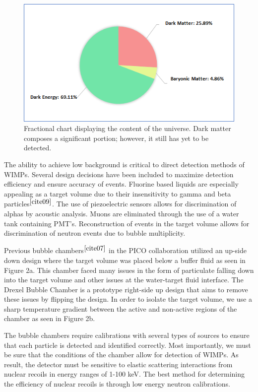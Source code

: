 \documentclass[%
12pt,
twoside,
reprint,
amsmath,amssymb,
aps,
]{article}
\begin{document}
	\begin{figure}
		\includegraphics[scale = 0.6, center]{Images/universe_composition.png}
		\caption{\label{tab:table-name} Fractional chart displaying the content of the universe. Dark matter composes a significant portion; however, it still has yet to be detected.}
	\end{figure}
	
	\par The ability to achieve low background is critical to direct detection methods of WIMPs. Several design decisions have been included to maximize detection efficiency and ensure accuracy of events. Fluorine based liquids are especially appealing as a target volume due to their insensitivity to gamma and beta particles$^{\cite{cite09}}$. The use of piezoelectric sensors allows for discrimination of alphas by acoustic analysis. Muons are eliminated through the use of a water tank containing PMT's. Reconstruction of events in the target volume allows for discrimination of neutron events due to bubble multiplicity. 
	\par Previous bubble chambers$^{\cite{cite07}}$ in the PICO collaboration utilized an up-side down design where the target volume was placed below a buffer fluid as seen in Figure 2a. This chamber faced many issues in the form of particulate falling down into the target volume and other issues at the water-target fluid interface. The Drexel Bubble Chamber is a prototype right-side up design that aims to remove these issues by flipping the design. In order to isolate the target volume, we use a sharp temperature gradient between the active and non-active regions of the chamber as seen in Figure 2b.
	\par The bubble chambers require calibrations with several types of sources to ensure that each particle is detected and identified correctly. Most importantly, we must be sure that the conditions of the chamber allow for detection of WIMPs. As result, the detector must be sensitive to elastic scattering interactions from nuclear recoils in energy ranges of 1-100 keV. The best method for determining the efficiency of nuclear recoils is through low energy neutron calibrations. 
	
\end{document}
